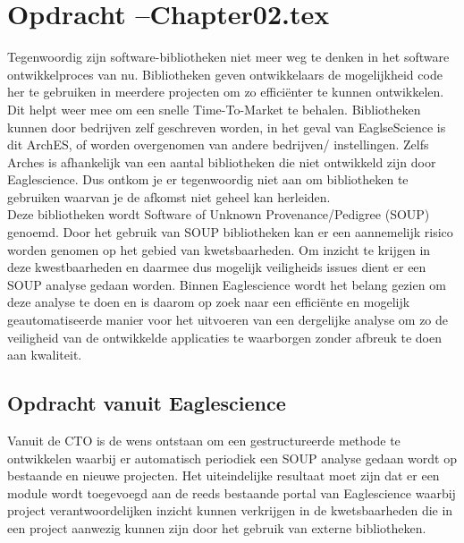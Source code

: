 
\chapter{Opdracht --Chapter02.tex} %

\label{ch:opdracht} %
Tegenwoordig zijn software-bibliotheken niet meer weg te denken in het software ontwikkelproces van nu. Bibliotheken geven ontwikkelaars de mogelijkheid code her te gebruiken in meerdere  projecten om zo effici\"enter te kunnen ontwikkelen. Dit helpt weer mee om een snelle Time-To-Market te behalen. Bibliotheken kunnen door bedrijven zelf geschreven worden, in het geval van EaglseScience is dit ArchES, of worden overgenomen van andere bedrijven/ instellingen. Zelfs Arches is afhankelijk van een aantal bibliotheken die niet ontwikkeld zijn door Eaglescience. Dus ontkom je er tegenwoordig niet aan om bibliotheken te gebruiken waarvan je de afkomst niet geheel kan herleiden. 
\\
Deze bibliotheken wordt Software of Unknown Provenance/Pedigree (SOUP) genoemd. Door het gebruik van SOUP bibliotheken kan er een aannemelijk risico worden genomen op het gebied van kwetsbaarheden. Om inzicht te krijgen in deze kwestbaarheden en daarmee dus mogelijk veiligheids issues dient er een SOUP analyse gedaan worden. Binnen Eaglescience wordt het belang gezien om deze analyse te doen en is daarom op zoek naar een efficiënte en mogelijk geautomatiseerde manier voor het uitvoeren van een dergelijke analyse om zo de veiligheid van de ontwikkelde applicaties te waarborgen zonder afbreuk te doen aan kwaliteit. 


\section{Opdracht vanuit Eaglescience}
Vanuit de CTO is de wens ontstaan om een gestructureerde methode te ontwikkelen waarbij er automatisch periodiek een SOUP analyse gedaan wordt op bestaande en nieuwe projecten. Het uiteindelijke resultaat moet zijn dat er een module wordt toegevoegd aan de reeds bestaande portal van Eaglescience waarbij project verantwoordelijken inzicht kunnen verkrijgen in de kwetsbaarheden die in een project aanwezig kunnen zijn door het gebruik van externe bibliotheken.

